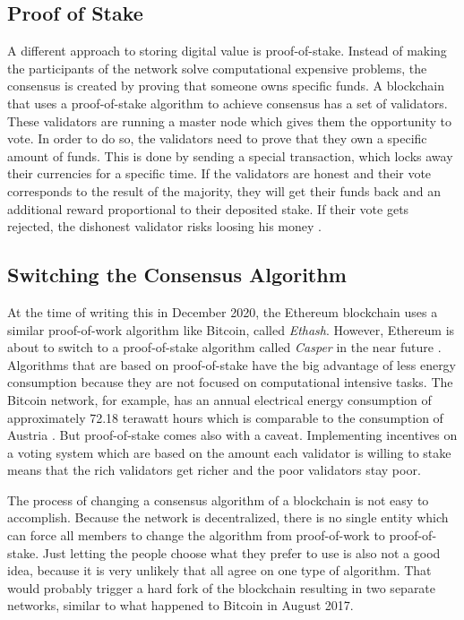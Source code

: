 \subsection{Proof of Stake}
A different approach to storing digital value is proof-of-stake. Instead of making the participants of the network solve computational expensive problems, the consensus is created by proving that someone owns specific funds. A blockchain that uses a proof-of-stake algorithm to achieve consensus has a set of validators. These validators are running a master node which gives them the opportunity to vote. In order to do so, the validators need to prove that they own a specific amount of funds. This is done by sending a special transaction, which locks away their currencies for a specific time. If the validators are honest and their vote corresponds to the result of the majority, they will get their funds back and an additional reward proportional to their deposited stake. If their vote gets rejected, the dishonest validator risks loosing his money \cite{AntonopoulosWood2018}.

\subsection{Switching the Consensus Algorithm}
At the time of writing this in December 2020, the Ethereum blockchain uses a similar proof-of-work algorithm like Bitcoin, called \textit{Ethash}. However, Ethereum is about to switch to a proof-of-stake algorithm called \textit{Casper} in the near future \cite{Twitter2018}. Algorithms that are based on proof-of-stake have the big advantage of less energy consumption because they are not focused on computational intensive tasks. The Bitcoin network, for example, has an annual electrical energy consumption of approximately 72.18 terawatt hours which is comparable to the consumption of Austria \cite{Digiconomist2020}. But proof-of-stake comes also with a caveat. Implementing incentives on a voting system which are based on the amount each validator is willing to stake means that the rich validators get richer and the poor validators stay poor.

The process of changing a consensus algorithm of a blockchain is not easy to accomplish. Because the network is decentralized, there is no single entity which can force all members to change the algorithm from proof-of-work to proof-of-stake. Just letting the people choose what they prefer to use is also not a good idea, because it is very unlikely that all agree on one type of algorithm. That would probably trigger a hard fork of the blockchain resulting in two separate networks, similar to what happened to Bitcoin in August 2017.

